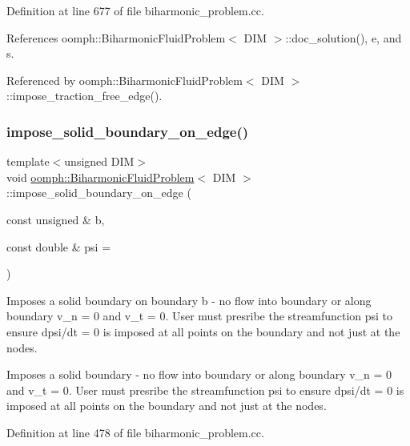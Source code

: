 Definition at line 677 of file biharmonic\+\_\+problem.\+cc.



References oomph\+::\+Biharmonic\+Fluid\+Problem$<$ D\+I\+M $>$\+::doc\+\_\+solution(), e, and s.



Referenced by oomph\+::\+Biharmonic\+Fluid\+Problem$<$ D\+I\+M $>$\+::impose\+\_\+traction\+\_\+free\+\_\+edge().

\mbox{\label{classoomph_1_1BiharmonicFluidProblem_a1a00fff232d2438c83b66437d8e86aab}} 
\subsubsection{\texorpdfstring{impose\+\_\+solid\+\_\+boundary\+\_\+on\+\_\+edge()}{impose\_solid\_boundary\_on\_edge()}}
{\footnotesize\ttfamily template$<$unsigned D\+IM$>$ \\
void \hyperlink{classoomph_1_1BiharmonicFluidProblem}{oomph\+::\+Biharmonic\+Fluid\+Problem}$<$ D\+IM $>$\+::impose\+\_\+solid\+\_\+boundary\+\_\+on\+\_\+edge (\begin{DoxyParamCaption}\item[{const unsigned \&}]{b,  }\item[{const double \&}]{psi = {} }\end{DoxyParamCaption})\hspace{0.3cm}{\ttfamily [protected]}}



Imposes a solid boundary on boundary b -\/ no flow into boundary or along boundary v\+\_\+n = 0 and v\+\_\+t = 0. User must presribe the streamfunction psi to ensure dpsi/dt = 0 is imposed at all points on the boundary and not just at the nodes. 

Imposes a solid boundary -\/ no flow into boundary or along boundary v\+\_\+n = 0 and v\+\_\+t = 0. User must presribe the streamfunction psi to ensure dpsi/dt = 0 is imposed at all points on the boundary and not just at the nodes. 

Definition at line 478 of file biharmonic\+\_\+problem.\+cc.



